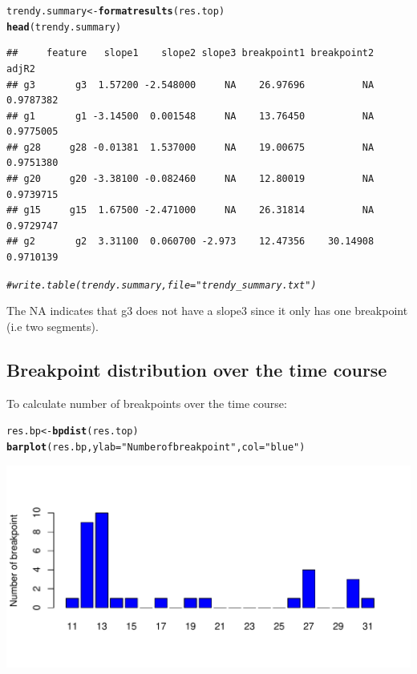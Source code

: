 \documentclass{article}\usepackage[]{graphicx}\usepackage[usenames,dvipsnames]{color}
\makeatletter
\newcommand{\hlstr}[1]{\textcolor[rgb]{0.192,0.494,0.8}{#1}}%
\newcommand{\hlcom}[1]{\textcolor[rgb]{0.678,0.584,0.686}{\textit{#1}}}%
\newcommand{\hlstd}[1]{\textcolor[rgb]{0.345,0.345,0.345}{#1}}%
\newcommand{\hlkwb}[1]{\textcolor[rgb]{0.69,0.353,0.396}{#1}}%
\newcommand{\hlkwc}[1]{\textcolor[rgb]{0.333,0.667,0.333}{#1}}%
\newcommand{\hlkwd}[1]{\textcolor[rgb]{0.737,0.353,0.396}{\textbf{#1}}}%
\newenvironment{kframe}{%
 \def\at@end@of@kframe{}%
 \ifinner\ifhmode%
  \def\at@end@of@kframe{\end{minipage}}%
  \begin{minipage}{\columnwidth}%
 \fi\fi%
 \def\FrameCommand##1{\hskip\@totalleftmargin \hskip-\fboxsep
 \colorbox{shadecolor}{##1}\hskip-\fboxsep
     \hskip-\linewidth \hskip-\@totalleftmargin \hskip\columnwidth}%
 \MakeFramed {\advance\hsize-\width
   \@totalleftmargin\z@ \linewidth\hsize
   \@setminipage}}%
 {\par\unskip\endMakeFramed%
 \at@end@of@kframe}
\newenvironment{knitrout}{}{} %
\makeatother
\begin{document}
\begin{knitrout}
\color{fgcolor}\begin{kframe}
\begin{alltt}
\hlstd{trendy.summary} \hlkwb{<-} \hlkwd{formatresults}\hlstd{(res.top)}
\hlkwd{head}\hlstd{(trendy.summary)}
\end{alltt}
\begin{verbatim}
##     feature   slope1    slope2 slope3 breakpoint1 breakpoint2     adjR2
## g3       g3  1.57200 -2.548000     NA    26.97696          NA 0.9787382
## g1       g1 -3.14500  0.001548     NA    13.76450          NA 0.9775005
## g28     g28 -0.01381  1.537000     NA    19.00675          NA 0.9751380
## g20     g20 -3.38100 -0.082460     NA    12.80019          NA 0.9739715
## g15     g15  1.67500 -2.471000     NA    26.31814          NA 0.9729747
## g2       g2  3.31100  0.060700 -2.973    12.47356    30.14908 0.9710139
\end{verbatim}
\begin{alltt}
\hlcom{# write.table(trendy.summary, file="trendy_summary.txt")}
\end{alltt}
\end{kframe}
\end{knitrout}
The NA indicates that g3 does not have a slope3 since it only has one breakpoint (i.e two segments).


\subsection{Breakpoint distribution over the time course}

To calculate number of breakpoints over the time course:

\begin{knitrout}
\color{fgcolor}\begin{kframe}
\begin{alltt}
\hlstd{res.bp} \hlkwb{<-} \hlkwd{bpdist}\hlstd{(res.top)}
\hlkwd{barplot}\hlstd{(res.bp,} \hlkwc{ylab}\hlstd{=}\hlstr{"Number of breakpoint"}\hlstd{,} \hlkwc{col}\hlstd{=}\hlstr{"blue"}\hlstd{)}
\end{alltt}
\end{kframe}

{\centering \includegraphics[width=.8\textwidth]{figure/unnamed-chunk-15-1} 

}



\end{knitrout}
\end{document}
